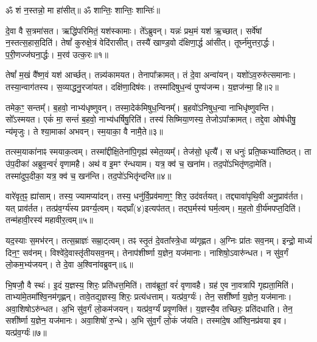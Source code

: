 \setcounter{anuvakam}{0}

ॐ शं न॒स्तन्नो॒ मा हा॑सीत्॥ ॐ शान्तिः॒ शान्तिः॒ शान्तिः॑॥

दे॒वा वै स॒त्रमा॑सत। 
ऋद्धि॑परिमितं॒ यश॑स्कामाः। 
ते᳚ऽब्रुवन्। 
यन्नः॑ प्रथ॒मं यश॑ ऋ॒च्छात्। 
सर्वे॑षां न॒स्तत्स॒हास॒दिति॑। 
तेषां᳚ कुरुक्षे॒त्रं वेदि॑रासीत्। 
तस्यै॑ खाण्ड॒वो द॑क्षिणा॒र्द्ध आ॑सीत्। 
तूर्घ्न॑मुत्तरा॒र्द्धः। 
प॒री॒णज्ज॑घना॒र्द्धः। 
म॒रव॑ उत्क॒रः॥१॥

तेषां᳚ म॒खं वै᳚ष्ण॒वं यश॑ आर्च्छत्। 
तन्न्य॑कामयत। 
तेनापा᳚क्रामत्। 
तं दे॒वा अन्वा॑यन्। 
यशो॑ऽव॒रुरु॑त्समानाः। 
तस्या॒न्वाग॑तस्य। 
स॒व्याद्धनु॒रजा॑यत। 
दक्षि॑णा॒दिष॑वः। 
तस्मा॑दिषुध॒न्वं पुण्य॑जन्म। 
य॒ज्ञज॑न्मा॒ हि॥२॥

तमेक॒ꣳ॒ सन्तम्᳚। 
ब॒हवो॒ नाभ्य॑धृष्णुवन्। 
तस्मा॒देक॑मिषुध॒न्वि\-नम्᳚। 
ब॒हवो॑ऽनिषुध॒न्वा नाभिधृ॑ष्णुवन्ति। 
सो᳚ऽस्मयत। 
एकं॑ मा॒ सन्तं॑ ब॒हवो॒ नाभ्य॑धर्\mbox{}षिषु॒रिति॑। 
तस्य॑ सिष्मिया॒णस्य॒ तेजोऽपा᳚क्रामत्। 
तद्दे॒वा ओष॑धीषु॒ न्य॑मृजुः। 
ते श्या॒माका॑ अभवन्। 
स्म॒याका॒ वै नामै॒ते॥३॥

तत्स्म॒याका॑नाꣴ स्मयाक॒त्वम्। 
तस्मा᳚द्दीक्षि॒तेना॑पि॒गृह्य॑ स्मेत॒व्यम्᳚। 
तेज॑सो॒ धृत्यै᳚। 
स धनुः॑ प्रति॒ष्कभ्या॑तिष्ठत्। 
ता उ॑प॒दीका॑ अब्रुव॒न्वरं॑ वृणामहै। 
अथ॑ व इ॒मꣳ र॑न्धयाम। 
यत्र॒ क्व॑ च॒ खना॑म। 
तद॒पो॑ऽभितृ॑णदा॒मेति॑। 
तस्मा॑दुप॒दीका॒ यत्र॒ क्व॑ च॒ खन॑न्ति। 
तद॒पो॑ऽभितृ॑न्दन्ति॥४॥

वारे॑वृत॒ꣴ॒ ह्या॑साम्। 
तस्य॒ ज्यामप्या॑दन्। 
तस्य॒ धनु॑र्वि॒प्रव॑माण॒ꣳ॒ शिर॒ उद॑वर्तयत्। 
तद्द्यावा॑पृथि॒वी अनु॒प्राव॑र्तत। 
यत् प्राव॑र्तत। 
तत्प्र॑व॒र्ग्य॑स्य प्रवर्ग्य॒त्वम्। 
यद्घ्राँ(४)इत्यप॑तत्। 
तद्\mbox{}घ॒र्मस्य॑ घर्म॒त्वम्। 
म॒ह॒तो वी॒र्य॑मपप्त॒दिति॑। 
तन्म॑हावी॒रस्य॑ महावीर॒त्वम्॥५॥

यद॒स्याः स॒मभ॑रन्। 
तत्स॒म्राज्ञः॑ सम्रा॒ट्त्वम्। 
तꣴ स्तृ॒तं दे॒वता᳚स्त्रे॒धा व्य॑गृह्णत। 
अ॒ग्निः प्रा॑तः सव॒नम्। 
इन्द्रो॒ माध्यं॑ दिन॒ꣳ॒ सव॑नम्। 
विश्वे॑दे॒वास्तृ॑तीयसव॒नम्। 
तेनाप॑शीर्ष्णा य॒ज्ञेन॒ यज॑मानाः। 
नाशिषो॒ऽवारु॑न्धत। 
न सु॑व॒र्गं लो॒कम॒भ्य॑जयन्। 
ते दे॒वा अ॒श्विना॑वब्रुवन्॥६॥

भि॒षजौ॒ वै स्थः॑। 
इ॒दं य॒ज्ञस्य॒ शिरः॒ प्रति॑धत्त॒मिति॑। 
ताव॑ब्रूतां॒ वरं॑ वृणावहै। 
ग्रह॑ ए॒व ना॒वत्रापि॑ गृह्यता॒मिति॑। 
ताभ्या॑मे॒तमा᳚श्वि॒नम॑गृह्णन्। 
तावे॒तद्य॒ज्ञस्य॒ शिरः॒ प्रत्य॑धत्ताम्। 
यत्प्र॑व॒र्ग्यः॑। 
तेन॒ सशी᳚र्ष्णा य॒ज्ञेन॒ यज॑मानाः। 
अवा॒शिषो\-ऽरु॑न्धत। 
अ॒भि सु॑व॒र्गं लो॒कम॑जयन्। 
यत्प्र॑व॒र्ग्यं॑ प्रवृ॒णक्ति॑। 
य॒ज्ञस्यै॒व तच्छिरः॒ प्रति॑दधाति। 
तेन॒ सशी᳚र्ष्णा य॒ज्ञेन॒ यज॑मानः। 
अवा॒शिषो॑ रु॒न्धे। 
अ॒भि सु॑व॒र्गं लो॒कं ज॑यति। 
तस्मा॑दे॒ष आ᳚श्वि॒नप्र॑वया इव। 
यत्प्र॑व॒र्ग्यः॑॥७॥
\anuvakamend[उ॒त्क॒रो ह्ये॑ते तृ॑न्दन्ति महावीर॒त्वम॑ब्रुवन्नजयन्त्स॒प्त च॑]

